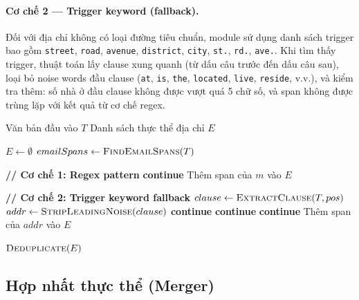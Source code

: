 \paragraph{Cơ chế 2 --- Trigger keyword (fallback).}
Đối với địa chỉ không có loại đường tiêu chuẩn, module sử dụng danh sách
trigger bao gồm \texttt{street}, \texttt{road}, \texttt{avenue},
\texttt{district}, \texttt{city}, \texttt{st.}, \texttt{rd.}, \texttt{ave.}.
Khi tìm thấy trigger, thuật toán lấy clause xung quanh (từ dấu câu trước đến
dấu câu sau), loại bỏ noise words đầu clause (\texttt{at}, \texttt{is},
\texttt{the}, \texttt{located}, \texttt{live}, \texttt{reside}, v.v.), và kiểm
tra thêm: số nhà ở đầu clause không được vượt quá 5 chữ số, và span không được
trùng lặp với kết quả từ cơ chế regex.

\begin{algorithm}[H]
\caption{Thuật toán nhận diện địa chỉ}
\label{alg:detect_address}
\begin{algorithmic}[1]
\Require Văn bản đầu vào $T$
\Ensure Danh sách thực thể địa chỉ $E$

\State $E \leftarrow \emptyset$
\State $emailSpans \leftarrow \textsc{FindEmailSpans}(T)$

\Statex \hspace{-\algorithmicindent}\textbf{// Cơ chế 1: Regex pattern}
     \textbf{continue} \EndIf
    \State Thêm span của $m$ vào $E$
\EndFor

\Statex \hspace{-\algorithmicindent}\textbf{// Cơ chế 2: Trigger keyword fallback}
        \State $clause \leftarrow \textsc{ExtractClause}(T, pos)$
        \State $addr \leftarrow \textsc{StripLeadingNoise}(clause)$
         \textbf{continue} \EndIf
         \textbf{continue} \EndIf
         \textbf{continue} \EndIf
        \State Thêm span của $addr$ vào $E$
    \EndFor
\EndFor

\State \Return $\textsc{Deduplicate}(E)$
\end{algorithmic}
\end{algorithm}

\subsection{Hợp nhất thực thể (Merger)}

